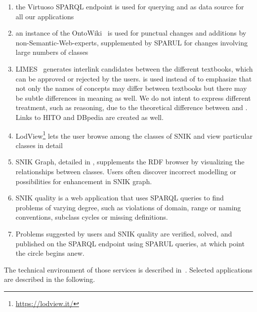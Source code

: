 \documentclass{IOS-Book-Article}     %
\newcommand{\citet}{\cite}%
\newcommand{\citep}{\cite}%
\begin{document}
\begin{enumerate}
\item the Virtuoso SPARQL endpoint is used for querying and as data source for all our applications  
\item an instance of the OntoWiki~\citep{ontowiki} is used for punctual changes and additions by non-Semantic-Web-experts, supplemented by SPARUL for changes involving large numbers of classes 
\item LIMES~\citep{limes} generates interlink candidates between the different textbooks, which can be approved or rejected by the users.
 is used instead of  to emphasize that not only the names of concepts may differ between textbooks but there may be subtle differences in meaning as well.
We do not intent to express different treatment, such as reasoning, due to the theoretical difference between  and .
Links to HITO and DBpedia are created as well.%
\item LodView\footnote{\url{https://lodview.it/}} lets the user browse among the classes of SNIK and view particular classes in detail
\item SNIK Graph, detailed in , supplements the RDF browser by visualizing the relationships between classes.
Users often discover incorrect modelling or possibilities for enhancement in SNIK graph.
\item SNIK quality is a web application that uses SPARQL queries to find problems of varying degree, such as violations of domain, range or naming conventions, subclass cycles or missing definitions.
\item Problems suggested by users and SNIK quality are verified, solved, and published on the SPARQL endpoint using SPARUL queries, at which point the circle begins anew.
\end{enumerate}

The technical environment of those services is described in~\citet{sniktec}.
Selected applications are described in the following.
\end{document}
